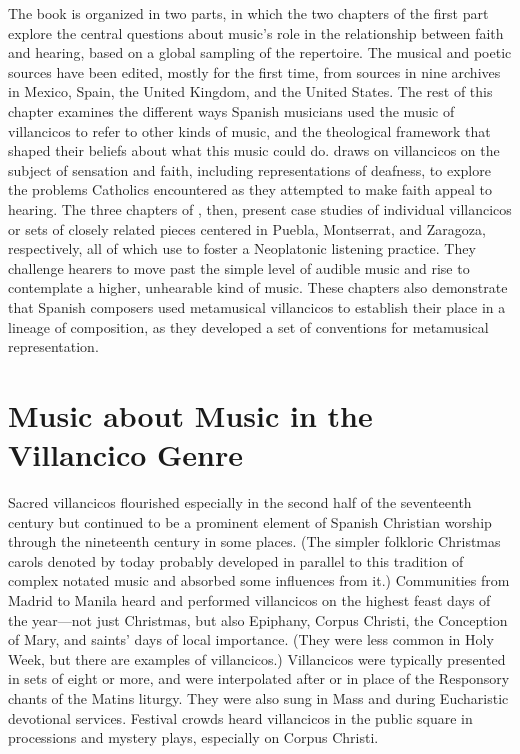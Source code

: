 The book is organized in two parts, in which the two chapters of the first part
explore the central questions about music's role in the relationship between
faith and hearing, based on a global sampling of the repertoire.
The musical and poetic sources have been edited, mostly for the first time,
from sources in nine archives in Mexico, Spain, the United Kingdom, and the
United States.
The rest of this chapter examines the different ways Spanish musicians used
the music of villancicos to refer to other kinds of music, and the theological
framework that shaped their beliefs about what this music could do.
 draws on villancicos on the subject of sensation and
faith, including representations of deafness, to explore the problems Catholics
encountered as they attempted to make faith appeal to hearing.
The three chapters of , then, present case studies
of individual villancicos or sets of closely related pieces centered in Puebla,
Montserrat, and Zaragoza, respectively, all of which use  to foster a Neoplatonic listening practice.
They challenge hearers to move past the simple level of audible music and rise
to contemplate a higher, unhearable kind of music.
These chapters also demonstrate that Spanish composers used metamusical
villancicos to establish their place in a lineage of composition, as they
developed a set of conventions for metamusical representation.


\section{Music about Music in the Villancico Genre}

Sacred villancicos flourished especially in the second half of the seventeenth
century but continued to be a prominent element of Spanish Christian worship
through the nineteenth century in some places.
(The simpler folkloric Christmas carols denoted by  today
probably developed in parallel to this tradition of complex notated music and
absorbed some influences from it.)
Communities from Madrid to Manila heard and performed villancicos on the
highest feast days of the year---not just Christmas, but also Epiphany, Corpus
Christi, the Conception of Mary, and saints' days of local importance.
(They were less common in Holy Week, but there are examples of 
villancicos.)
Villancicos were typically presented in sets of eight or more, and were
interpolated after or in place of the Responsory chants of the Matins liturgy.
They were also sung in Mass and during Eucharistic devotional services.
Festival crowds heard villancicos in the public square in processions and
mystery plays, especially on Corpus Christi.

